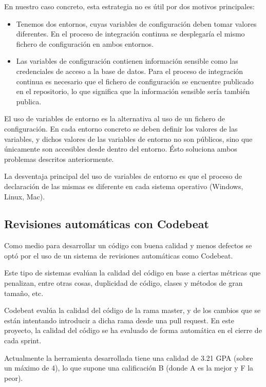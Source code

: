 En nuestro caso concreto, esta estrategia no es útil por dos motivos principales:

\begin{itemize}
	\item Tenemos dos entornos, cuyas variables de configuración deben tomar valores diferentes. En el proceso de integración continua se desplegaría el mismo fichero de configuración en ambos entornos.
	\item Las variables de configuración contienen información sensible como las credenciales de acceso a la base de datos. Para el proceso de integración continua es necesario que el fichero de configuración se encuentre publicado en el repositorio, lo que significa que la información sensible sería también publica.
\end{itemize}

El uso de variables de entorno es la alternativa al uso de un fichero de configuración. En cada entorno concreto se deben definir los valores de las variables, y dichos valores de las variables de entorno no son públicos, sino que únicamente son accesibles desde dentro del entorno. Ésto soluciona ambos problemas descritos anteriormente.

La desventaja principal del uso de variables de entorno es que el proceso de declaración de las mismas es diferente en cada sistema operativo (Windows, Linux, Mac).

\subsection{Revisiones automáticas con Codebeat}

Como medio para desarrollar un código con buena calidad y menos defectos se optó por el uso de un sistema de revisiones automáticas como Codebeat.

Este tipo de sistemas evalúan la calidad del código en base a ciertas métricas que penalizan, entre otras cosas, duplicidad de código, clases y métodos de gran tamaño, etc.

Codebeat evalúa la calidad del código de la rama master, y de los cambios que se están intentando introducir a dicha rama desde una pull request. En este proyecto, la calidad del código se ha evaluado de forma automática en el cierre de cada sprint.

Actualmente la herramienta desarrollada tiene una calidad de 3.21 GPA (sobre un máximo de 4), lo que supone una calificación B (donde A es la mejor y F la peor).

